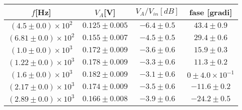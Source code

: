 \begin{tabular}{cccc}
\hline
	$f$[Hz] & $V_A$[V] & $V_A/V_{in}[dB]$ & fase [gradi]\\ 
\hline
	$(4.5\pm0.0)\times 10^{2}$ & $0.125\pm0.005$ & $-6.4\pm0.5$ & $43.4\pm0.9$ \\
	$(6.81\pm0.0)\times 10^{2}$ & $0.155\pm0.007$ & $-4.5\pm0.5$ & $29.4\pm0.6$ \\
	$(1.0\pm0.0)\times 10^{3}$ & $0.172\pm0.009$ & $-3.6\pm0.6$ & $15.9\pm0.3$ \\
	$(1.22\pm0.0)\times 10^{3}$ & $0.178\pm0.009$ & $-3.3\pm0.6$ & $11.3\pm0.2$ \\
	$(1.6\pm0.0)\times 10^{3}$ & $0.182\pm0.009$ & $-3.1\pm0.6$ & $0\pm4.0\times 10^{-1}$ \\
	$(2.17\pm0.0)\times 10^{3}$ & $0.174\pm0.009$ & $-3.5\pm0.6$ & $-11.6\pm0.2$ \\
	$(2.89\pm0.0)\times 10^{3}$ & $0.166\pm0.008$ & $-3.9\pm0.6$ & $-24.2\pm0.5$ \\
\hline
\end{tabular}
